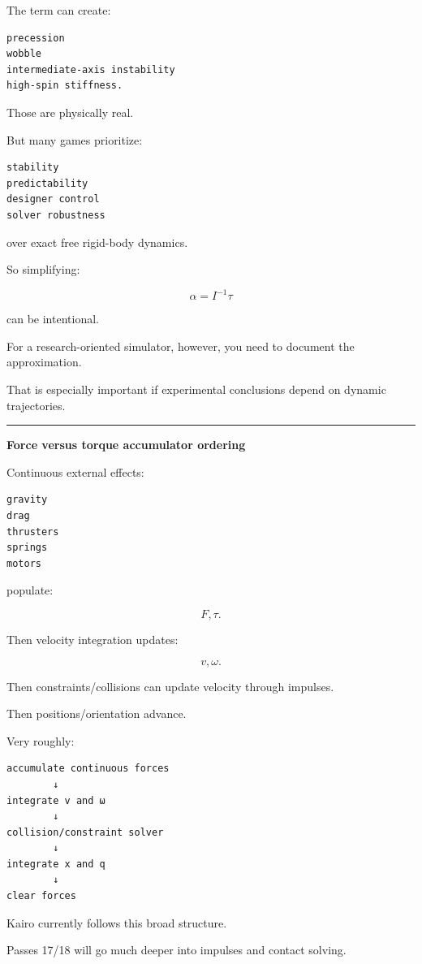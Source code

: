 The term can create:

\begin{verbatim}
precession
wobble
intermediate-axis instability
high-spin stiffness.
\end{verbatim}

Those are physically real.

But many games prioritize:

\begin{verbatim}
stability
predictability
designer control
solver robustness
\end{verbatim}

over exact free rigid-body dynamics.

So simplifying:

\[
\alpha=I^{-1}\tau
\]

can be intentional.

For a research-oriented simulator, however, you need to document the approximation.

That is especially important if experimental conclusions depend on dynamic trajectories.

\begin{center}\rule{0.5\linewidth}{0.5pt}\end{center}

\textbf{Force versus torque accumulator ordering}

Continuous external effects:

\begin{verbatim}
gravity
drag
thrusters
springs
motors
\end{verbatim}

populate:

\[
F,\tau.
\]

Then velocity integration updates:

\[
v,\omega.
\]

Then constraints/collisions can update velocity through impulses.

Then positions/orientation advance.

Very roughly:

\begin{verbatim}
accumulate continuous forces
        ↓
integrate v and ω
        ↓
collision/constraint solver
        ↓
integrate x and q
        ↓
clear forces
\end{verbatim}

Kairo currently follows this broad structure.

Passes 17/18 will go much deeper into impulses and contact solving.

